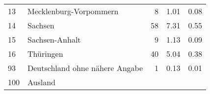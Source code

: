 \begin{longtable}{lXrrr}
     13 &
     \multicolumn{1}{X}{ Mecklenburg-Vorpommern   } &


       \num{8} &
       \num[round-mode=places,round-precision=2]{1.01} &
         \num[round-mode=places,round-precision=2]{0.08} \\

     14 &
     \multicolumn{1}{X}{ Sachsen   } &


       \num{58} &
       \num[round-mode=places,round-precision=2]{7.31} &
         \num[round-mode=places,round-precision=2]{0.55} \\

     15 &
     \multicolumn{1}{X}{ Sachsen-Anhalt   } &


       \num{9} &
       \num[round-mode=places,round-precision=2]{1.13} &
         \num[round-mode=places,round-precision=2]{0.09} \\

     16 &
     \multicolumn{1}{X}{ Thüringen   } &


       \num{40} &
       \num[round-mode=places,round-precision=2]{5.04} &
         \num[round-mode=places,round-precision=2]{0.38} \\

     93 &
     \multicolumn{1}{X}{ Deutschland ohne nähere Angabe   } &


       \num{1} &
       \num[round-mode=places,round-precision=2]{0.13} &
         \num[round-mode=places,round-precision=2]{0.01} \\

     100 &
     \multicolumn{1}{X}{ Ausland   } &



\end{longtable}

